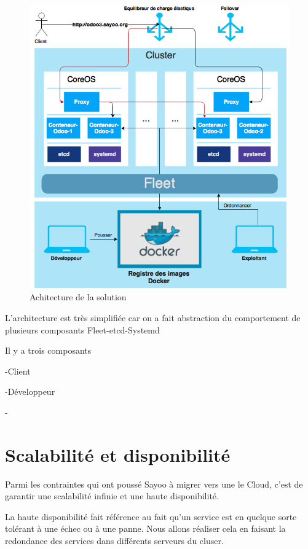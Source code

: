 \begin{onehalfspace}
\begin{figure}[H]
\centering
\includegraphics [scale=0.7]{chapitre4/assets/architecture}
\caption{Achitecture de la solution}
\label{fig:}
\end{figure}

L'architecture est très simplifiée car on a fait abstraction du comportement de plusieurs composants Fleet-etcd-Systemd


Il y a trois composants

-Client

-Développeur

-



\section{Scalabilité et disponibilité}


Parmi les contraintes qui ont poussé Sayoo à migrer vers une le Cloud, c'est de garantir une scalabilité infinie et une haute disponibilité.

La haute disponibilité fait référence au fait qu'un service est en quelque sorte tolérant à une échec ou à une panne. Nous allons réaliser cela en faisant la redondance des services dans différents serveurs du cluser.


\end{onehalfspace}
